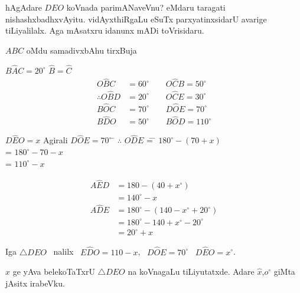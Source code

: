 hAgAdare $DEO$ koVnada parimANaveVnu? eMdaru taragati nishashxbadhxvAyitu. vidAyxthiRgaLu eSuTx parxyatinxsidarU avarige tiLiyalilalx. Aga mAsatxru idanunx mADi toVrisidaru.

$ABC$ \quad oMdu samadivxbAhu tirxBuja

$B\widehat{A}C=20^\circ$ \qquad $\widehat{B}=\widehat{C}$
\begin{align*}
O\widehat{B}C &=60^\circ  \qquad O\widehat{C}B =50^\circ\\
\therefore O\widehat{B}D  &=20^\circ  \qquad O\widehat{C}E =30^\circ\\
B\widehat{O}C &=70^\circ   \qquad D\widehat{O}E =70^\circ\\
B\widehat{D}O &=50^\circ   \qquad B\widehat{O}D =110^\circ
\end{align*}

\begin{tabbing}
$D\widehat{E}O=x$  \; \; Agirali \;\; $D\widehat{O}E=70^\circ$ \;\; \= $\therefore$ \;\; $O\widehat{D}E$ \= = \= $180^\circ-(70+x)$\\
\> \> = \> $180^\circ-70-x$\\
\> \> = \> $110^\circ-x$
\end{tabbing}
\begin{align*}
A\widehat{E}D &=180-(40+x^\circ)\\
&=140^\circ-x\\
A\widehat{D}E & =180^\circ-(140-x^\circ+20^\circ)\\
&=180^\circ-140+x^\circ-20^\circ\\
& =20^\circ+x
\end{align*}

Iga $\bigtriangleup DEO$~ nalilx~ $E\widehat{D}O=110-x$,~ $D\widehat{O}E=70^\circ$~ $D\widehat{E}O=x^\circ$.

$x$ ge yAva belekoTaTxrU $\bigtriangleup DEO$ na koVnagaLu tiLiyutatxde. Adare  $\widehat{x}$,\break $o^\circ$ giMta jAsitx irabeVku.
